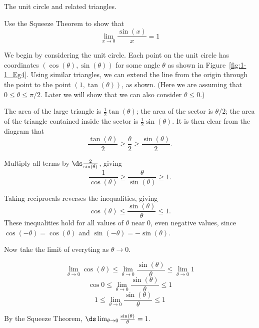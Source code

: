 \begin{marginfigure}
\caption{The unit circle and related triangles.}\label{fig:1-1_Eg4}
\end{marginfigure}

\begin{example} \label{Ex:1.1.Eg4}
Use the Squeeze Theorem to show that
\[ \lim_{x \to 0} \frac{\sin(x)}{x} = 1 \]

\solution We begin by considering the unit circle. Each point on the unit circle has coordinates $(\cos (\theta),\sin (\theta))$ for some angle $\theta$ as shown in Figure~\ref{fig:1-1_Eg4}. Using similar triangles, we can extend the line from the origin through the point to the point $(1,\tan (\theta))$, as shown. (Here we are assuming that $0 \leq \theta \leq \pi/2$. Later we will show that we can also consider $\theta \leq 0$.)

The area of the large triangle is $\frac{1}{2} \tan(\theta)$; the area of the sector is $\theta/2$; the area of the triangle contained inside the sector is $\frac{1}{2} \sin(\theta)$. It is then clear from the diagram that 
\[ \frac{\tan (\theta)}{2} \geq \frac{\theta}{2} \geq \frac{\sin (\theta)}{2}.\]

Multiply all terms by $\ds \frac{2}{\sin(\theta)}$, giving 
\[ \frac{1}{\cos(\theta)} \geq \frac{\theta}{\sin (\theta)} \geq 1.\]

Taking reciprocals reverses the inequalities, giving 
\[ \cos (\theta) \leq \frac{\sin(\theta)}{\theta} \leq 1.\]
These inequalities hold for all values of $\theta$ near 0, even negative values, since $\cos (-\theta) = \cos(\theta)$ and $\sin (-\theta) = -\sin (\theta)$.

Now take the limit of everyting as $\theta \to 0$.

\[ \lim_{\theta \to 0} \cos (\theta) \leq \lim_{\theta \to 0} \frac{\sin(\theta)}{\theta} \leq \lim_{\theta \to 0}  1 \]
\[ \cos 0 \leq \lim_{\theta \to 0} \frac{\sin(\theta)}{\theta} \leq  1 \]
\[ 1 \leq \lim_{\theta \to 0} \frac{\sin(\theta)}{\theta} \leq  1 \]

By the Squeeze Theorem, $\ds \lim_{\theta \to 0} \frac{\sin(\theta)}{\theta}=1$.
\end{example}
